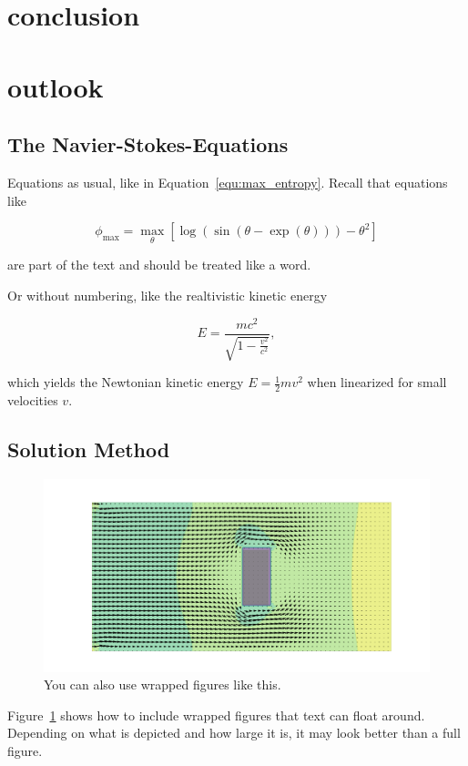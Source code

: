 \documentclass[11pt,table]{article}
\begin{document}
\section{conclusion}
\section{outlook}

\subsection{The Navier-Stokes-Equations}

Equations as usual, like in Equation~\ref{equ:max_entropy}. Recall that equations like

\begin{equation}\label{equ:max_entropy}
	\phi_\mathrm{max} = \max_{\theta} \left[ \log(\sin(\theta - \exp(\theta))) - \theta^2 \right]
\end{equation}

are part of the text and should be treated like a word.


Or without numbering, like the realtivistic kinetic energy 

\begin{equation*}
	E = \frac{mc^2}{\sqrt{1 - \frac{v^2}{c^2}}},
\end{equation*}

which yields the Newtonian kinetic energy $E = \frac 1 2 m v^2$ when linearized for small velocities $v$.

\subsection{Solution Method}
\begin{figure}
	\centering
	\includegraphics[scale=1.0]{Figures/example_cover.png}
	\caption{You can also use wrapped figures like this.}
	\label{fig:wrapfigure_example}
\end{figure}
Figure~\ref{fig:wrapfigure_example} shows how to include wrapped figures that text can float around. Depending on what is depicted and how large it is, it may look better than a full figure.
\end{document}
